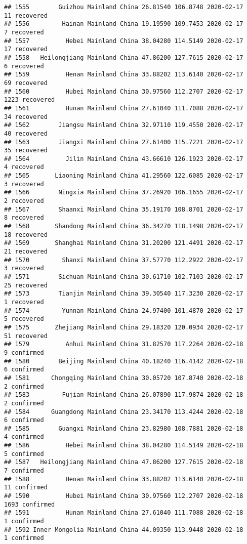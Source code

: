 \documentclass[
]{article}
\begin{document}
\begin{verbatim}
## 1555        Guizhou Mainland China 26.81540 106.8748 2020-02-17    11 recovered
## 1556         Hainan Mainland China 19.19590 109.7453 2020-02-17     7 recovered
## 1557          Hebei Mainland China 38.04280 114.5149 2020-02-17    17 recovered
## 1558   Heilongjiang Mainland China 47.86200 127.7615 2020-02-17     6 recovered
## 1559          Henan Mainland China 33.88202 113.6140 2020-02-17    69 recovered
## 1560          Hubei Mainland China 30.97560 112.2707 2020-02-17  1223 recovered
## 1561          Hunan Mainland China 27.61040 111.7088 2020-02-17    34 recovered
## 1562        Jiangsu Mainland China 32.97110 119.4550 2020-02-17    40 recovered
## 1563        Jiangxi Mainland China 27.61400 115.7221 2020-02-17    35 recovered
## 1564          Jilin Mainland China 43.66610 126.1923 2020-02-17     4 recovered
## 1565       Liaoning Mainland China 41.29560 122.6085 2020-02-17     3 recovered
## 1566        Ningxia Mainland China 37.26920 106.1655 2020-02-17     2 recovered
## 1567        Shaanxi Mainland China 35.19170 108.8701 2020-02-17     8 recovered
## 1568       Shandong Mainland China 36.34270 118.1498 2020-02-17    18 recovered
## 1569       Shanghai Mainland China 31.20200 121.4491 2020-02-17    21 recovered
## 1570         Shanxi Mainland China 37.57770 112.2922 2020-02-17     3 recovered
## 1571        Sichuan Mainland China 30.61710 102.7103 2020-02-17    25 recovered
## 1573        Tianjin Mainland China 39.30540 117.3230 2020-02-17     1 recovered
## 1574         Yunnan Mainland China 24.97400 101.4870 2020-02-17     5 recovered
## 1575       Zhejiang Mainland China 29.18320 120.0934 2020-02-17    51 recovered
## 1579          Anhui Mainland China 31.82570 117.2264 2020-02-18     9 confirmed
## 1580        Beijing Mainland China 40.18240 116.4142 2020-02-18     6 confirmed
## 1581      Chongqing Mainland China 30.05720 107.8740 2020-02-18     2 confirmed
## 1583         Fujian Mainland China 26.07890 117.9874 2020-02-18     2 confirmed
## 1584      Guangdong Mainland China 23.34170 113.4244 2020-02-18     6 confirmed
## 1585        Guangxi Mainland China 23.82980 108.7881 2020-02-18     4 confirmed
## 1586          Hebei Mainland China 38.04280 114.5149 2020-02-18     5 confirmed
## 1587   Heilongjiang Mainland China 47.86200 127.7615 2020-02-18     7 confirmed
## 1588          Henan Mainland China 33.88202 113.6140 2020-02-18    11 confirmed
## 1590          Hubei Mainland China 30.97560 112.2707 2020-02-18  1693 confirmed
## 1591          Hunan Mainland China 27.61040 111.7088 2020-02-18     1 confirmed
## 1592 Inner Mongolia Mainland China 44.09350 113.9448 2020-02-18     1 confirmed

\end{verbatim}
\end{document}

